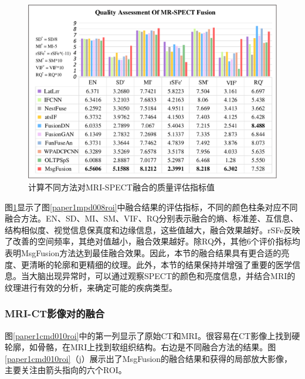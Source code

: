     \begin{figure}[ht]
      \centering
          \includegraphics[width=0.9\columnwidth]{figs/paper1MPDindex.pdf}
          \caption{计算不同方法对MRI-SPECT融合的质量评估指标值}\label{paper1MPDindex}
     \end{figure}

图\ref{paper1MPDindex}显示了图\ref{paper1mpd008roi}中融合结果的评估指标，不同的颜色柱条对应不同融合方法。EN、SD、MI、SM、VIF、RQ分别表示融合的熵、标准差、互信息、结构相似度、视觉信息保真度和边缘信息，这些值越大，融合效果越好。rSFe反映了改善的空间频率，其绝对值越小，融合效果越好。除RQ外，其他6个评价指标均表明MsgFusion方法达到最佳融合效果。因此，本节的融合结果具有更合适的亮度、更清晰的轮廓和更精细的纹理。此外，本节的结果保持并增强了重要的医学信息。当大脑出现异常时，可以通过观察SPECT的颜色和亮度信息，并结合MRI的纹理进行有效的分析，来确定可能的疾病类型。

\subsubsection{MRI-CT影像对的融合}
图\ref{paper1cmd010roi}中的第一列显示了原始CT和MRI。很容易在CT影像上找到硬轮廓，如骨骼，在MRI上找到软组织结构。右边是不同融合方法的结果。图\ref{paper1cmd010roi}（j）展示出了MsgFusion的融合结果和获得的局部放大影像，主要关注由箭头指向的六个ROI。

